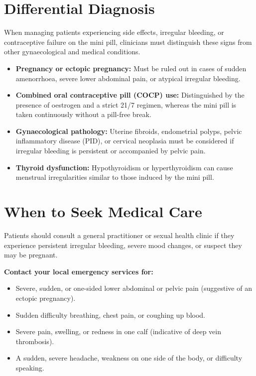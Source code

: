 \section*{Differential Diagnosis}
When managing patients experiencing side effects, irregular bleeding, or contraceptive failure on the mini pill, clinicians must distinguish these signs from other gynaecological and medical conditions.
\begin{itemize}
    \item \textbf{Pregnancy or ectopic pregnancy:} Must be ruled out in cases of sudden amenorrhoea, severe lower abdominal pain, or atypical irregular bleeding.
    \item \textbf{Combined oral contraceptive pill (COCP) use:} Distinguished by the presence of oestrogen and a strict 21/7 regimen, whereas the mini pill is taken continuously without a pill-free break.
    \item \textbf{Gynaecological pathology:} Uterine fibroids, endometrial polyps, pelvic inflammatory disease (PID), or cervical neoplasia must be considered if irregular bleeding is persistent or accompanied by pelvic pain.
    \item \textbf{Thyroid dysfunction:} Hypothyroidism or hyperthyroidism can cause menstrual irregularities similar to those induced by the mini pill.
\end{itemize}

\section*{When to Seek Medical Care}
Patients should consult a general practitioner or sexual health clinic if they experience persistent irregular bleeding, severe mood changes, or suspect they may be pregnant.

\textbf{Contact your local emergency services for:}
\begin{itemize}
    \item Severe, sudden, or one-sided lower abdominal or pelvic pain (suggestive of an ectopic pregnancy).
    \item Sudden difficulty breathing, chest pain, or coughing up blood.
    \item Severe pain, swelling, or redness in one calf (indicative of deep vein thrombosis).
    \item A sudden, severe headache, weakness on one side of the body, or difficulty speaking.
\end{itemize}

